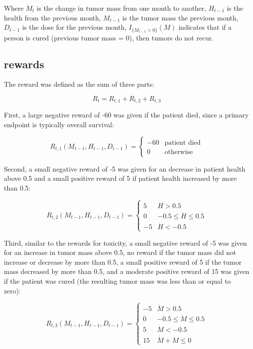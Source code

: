 \documentclass[12pt]{article}
\begin{document}
Where $\dot{M}_{t}$ is the change in tumor mass from one month to another,
$H_{t-1}$ is the health from the previous month,
$M_{t-1}$ is the tumor mass the previous month,
$D_{t-1}$ is the dose for the previous month,
$I_{\{M_{t-1} > 0\}}(M)$ indicates that if a person is cured (previous tumor mass = 0), then tumors do not recur.



\subsection{rewards} %
\label{sub:}

The reward was defined as the sum of three parts: 

\[
R_{t} = R_{t, 1} + R_{t, 2} + R_{t, 3}
\]

First, a large negative reward of -60 was given if the patient died, since a primary endpoint is typically overall survival:

\[
R_{t, 1}(M_{t-1}, H_{t-1}, D_{t-1}) = 
\begin{cases}
  -60 & \text{patient died} \\
  0 & \text{otherwise}
\end{cases}
\]

Second, a small negative reward of -5 was given for an decrease in patient health above 0.5 and a small positive reward of 5 if patient health increased by more than 0.5:

\[
R_{t, 2}(M_{t-1}, H_{t-1}, D_{t-1}) =  
\begin{cases}
  5 & \dot{H} > 0.5 \\
  0 & -0.5 \leq \dot{H} \leq 0.5 \\
  -5 & \dot{H} < -0.5
\end{cases}
\]

Third, similar to the rewards for toxicity, a small negative reward of -5 was given for an increase in tumor mass above 0.5, no reward if the tumor mass did not increase or decrease by more than 0.5, a small positive reward of 5 if the tumor mass decreased by more than 0.5, and a moderate positive reward of 15 was given if the patient was cured (the resulting tumor mass was less than or equal to zero):

\[
R_{t, 3}(M_{t-1}, H_{t-1}, D_{t-1}) = 
\begin{cases}
  -5 & \dot{M} > 0.5 \\
  0 & -0.5 \leq \dot{M} \leq 0.5 \\
  5 & \dot{M} < -0.5 \\
  15 & \dot{M} + M \leq 0
\end{cases}
\]
\end{document}

